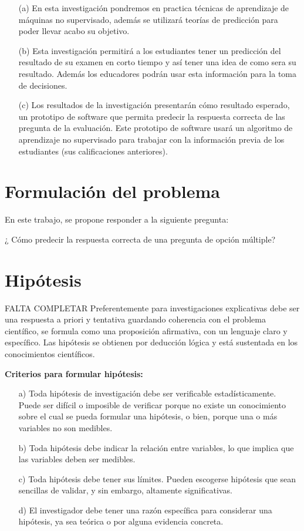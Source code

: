 \begin{enumerate}
\item[(a)] En esta investigación pondremos en practica técnicas de aprendizaje de máquinas no supervisado, además se utilizará teorías de predicción para poder llevar acabo su objetivo. 

\item[(b)]Esta investigación permitirá a los estudiantes tener un predicción del resultado de su examen en corto tiempo y así tener una idea de como sera su resultado. Además los educadores podrán usar esta información para la toma de decisiones.

\item[(c)]Los resultados de la investigación presentarán cómo resultado esperado, un prototipo de software que permita predecir la respuesta correcta de las pregunta de la evaluación. Este prototipo de software usará un algoritmo de aprendizaje no supervisado para trabajar con la información previa de los estudiantes (sus calificaciones anteriores).
\end{enumerate}


\section{Formulación del problema}

  En este trabajo, se propone responder a la siguiente pregunta:
 \begin{center} 
     ¿ Cómo predecir la respuesta correcta de una pregunta de opción múltiple?
 \end{center}


\section{Hipótesis}
FALTA COMPLETAR
Preferentemente para investigaciones explicativas debe ser una respuesta a priori y tentativa guardando coherencia con el problema científico, se formula como una proposición afirmativa, con un lenguaje claro y específico.  Las hipótesis se obtienen por deducción lógica y está sustentada en los conocimientos científicos. \par  
\vskip 0.3cm
{\bf Criterios para formular hipótesis:} \cite{Erica}
\begin{enumerate}
\item[a)] Toda hipótesis de investigación debe ser verificable estadísticamente.  Puede ser difícil o imposible de verificar porque no existe un conocimiento sobre el cual se pueda formular una hipótesis, o bien, porque una o más variables no son medibles.
\vskip 0.2cm
\item[b)] Toda hipótesis debe indicar la relación entre variables, lo que implica que las variables deben ser medibles.
\vskip 0.2cm
\item[c)] Toda hipótesis debe tener sus límites. Pueden escogerse hipótesis que sean sencillas de validar, y sin embargo, altamente significativas.
\vskip 0.2cm
\item[d)] El investigador debe tener una razón específica para considerar una hipótesis, ya sea teórica o por alguna evidencia concreta.    
\end{enumerate}


